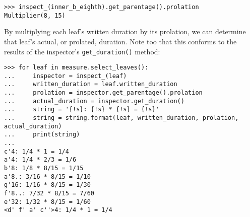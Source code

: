\begin{comment}
<abjad>
inspect_(inner_b_eighth).get_parentage().prolation
</abjad>
\end{comment}

\begin{abjadbookoutput}
\begin{singlespacing}
\vspace{-0.5\baselineskip}
\begin{lstlisting}
>>> inspect_(inner_b_eighth).get_parentage().prolation
Multiplier(8, 15)
\end{lstlisting}
\end{singlespacing}
\end{abjadbookoutput}

By multiplying each leaf's written duration by its prolation, we can determine
that leaf's actual, or prolated, duration. Note too that this conforms to the
results of the inspector's \texttt{get\_duration()} method:

\begin{comment}
<abjad>
for leaf in measure.select_leaves():
    inspector = inspect_(leaf)
    written_duration = leaf.written_duration
    prolation = inspector.get_parentage().prolation
    actual_duration = inspector.get_duration()
    string = '{!s}: {!s} * {!s} = {!s}'
    string = string.format(leaf, written_duration, prolation, actual_duration)
    print(string)

</abjad>
\end{comment}

\begin{abjadbookoutput}
\begin{singlespacing}
\vspace{-0.5\baselineskip}
\begin{lstlisting}
>>> for leaf in measure.select_leaves():
...     inspector = inspect_(leaf)
...     written_duration = leaf.written_duration
...     prolation = inspector.get_parentage().prolation
...     actual_duration = inspector.get_duration()
...     string = '{!s}: {!s} * {!s} = {!s}'
...     string = string.format(leaf, written_duration, prolation, actual_duration)
...     print(string)
...
c'4: 1/4 * 1 = 1/4
a'4: 1/4 * 2/3 = 1/6
b'8: 1/8 * 8/15 = 1/15
a'8.: 3/16 * 8/15 = 1/10
g'16: 1/16 * 8/15 = 1/30
f'8..: 7/32 * 8/15 = 7/60
e'32: 1/32 * 8/15 = 1/60
<d' f' a' c''>4: 1/4 * 1 = 1/4
\end{lstlisting}
\end{singlespacing}
\end{abjadbookoutput}


